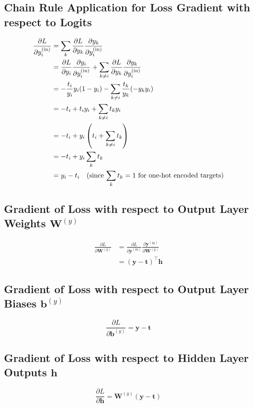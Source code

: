 \documentclass[11pt]{article}
\begin{document}
\subsection*{Chain Rule Application for Loss Gradient with respect to Logits}
\begin{align*}
\frac{\partial L}{\partial y^{(\text{in})}_i} &= \sum_k \frac{\partial L}{\partial y_k} \frac{\partial y_k}{\partial y^{(\text{in})}_i} \\
&= \frac{\partial L}{\partial y_i} \frac{\partial y_i}{\partial y^{(\text{in})}_i} + \sum_{k \neq i} \frac{\partial L}{\partial y_k} \frac{\partial y_k}{\partial y^{(\text{in})}_i} \\
&= -\frac{t_i}{y_i} y_i (1 - y_i) - \sum_{k \neq i} \frac{t_k}{y_k} (-y_k y_i) \\
&= -t_i + t_i y_i + \sum_{k \neq i} t_k y_i \\
&= -t_i + y_i \left(t_i + \sum_{k \neq i} t_k\right) \\
&= -t_i + y_i \sum_k t_k \\
&= y_i - t_i \quad \text{(since \( \sum_k t_k = 1 \) for one-hot encoded targets)}
\end{align*}

\subsection*{Gradient of Loss with respect to Output Layer Weights \( \mathbf{W}^{(y)} \)}
\begin{align*}
\frac{\partial L}{\partial \mathbf{W}^{(y)}} &= \frac{\partial L}{\partial \mathbf{y}^{(\text{in})}} \frac{\partial \mathbf{y}^{(\text{in})}}{\partial \mathbf{W}^{(y)}} \\
&= \left( \mathbf{y} - \mathbf{t} \right)^\top \mathbf{h}
\end{align*}

\subsection*{Gradient of Loss with respect to Output Layer Biases \( \mathbf{b}^{(y)} \)}
\begin{equation*}
\frac{\partial L}{\partial \mathbf{b}^{(y)}} = \mathbf{y} - \mathbf{t}
\end{equation*}

\subsection*{Gradient of Loss with respect to Hidden Layer Outputs \( \mathbf{h} \)}
\begin{equation*}
\frac{\partial L}{\partial \mathbf{h}} = \mathbf{W}^{(y)} \left( \mathbf{y} - \mathbf{t} \right)
\end{equation*}
\end{document}
